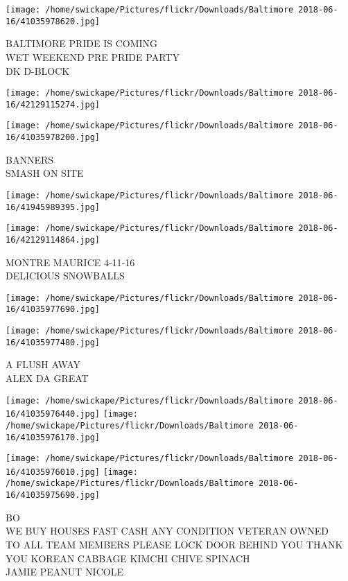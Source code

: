 \documentclass[10pt,letterpaper]{article}
\begin{document}
\vspace{0.25in}
\texttt{[image: /home/swickape/Pictures/flickr/Downloads/Baltimore 2018-06-16/41035978620.jpg]}

BALTIMORE PRIDE IS COMING\\
WET WEEKEND PRE PRIDE PARTY\\
DK D{-}BLOCK
\pagebreak

\texttt{[image: /home/swickape/Pictures/flickr/Downloads/Baltimore 2018-06-16/42129115274.jpg]}

\vspace{0.25in}
\texttt{[image: /home/swickape/Pictures/flickr/Downloads/Baltimore 2018-06-16/41035978200.jpg]}

BANNERS\\
SMASH ON SITE
\pagebreak

\texttt{[image: /home/swickape/Pictures/flickr/Downloads/Baltimore 2018-06-16/41945989395.jpg]}

\vspace{0.25in}
\texttt{[image: /home/swickape/Pictures/flickr/Downloads/Baltimore 2018-06-16/42129114864.jpg]}

MONTRE MAURICE 4{-}11{-}16\\
DELICIOUS SNOWBALLS
\pagebreak

\texttt{[image: /home/swickape/Pictures/flickr/Downloads/Baltimore 2018-06-16/41035977690.jpg]}

\vspace{0.25in}
\texttt{[image: /home/swickape/Pictures/flickr/Downloads/Baltimore 2018-06-16/41035977480.jpg]}

A FLUSH AWAY\\
ALEX DA GREAT
\pagebreak

\texttt{[image: /home/swickape/Pictures/flickr/Downloads/Baltimore 2018-06-16/41035976440.jpg]}
\texttt{[image: /home/swickape/Pictures/flickr/Downloads/Baltimore 2018-06-16/41035976170.jpg]}

\texttt{[image: /home/swickape/Pictures/flickr/Downloads/Baltimore 2018-06-16/41035976010.jpg]}
\texttt{[image: /home/swickape/Pictures/flickr/Downloads/Baltimore 2018-06-16/41035975690.jpg]}

BO\\
WE BUY HOUSES FAST CASH ANY CONDITION VETERAN OWNED\\
TO ALL TEAM MEMBERS PLEASE LOCK DOOR BEHIND YOU THANK YOU KOREAN CABBAGE KIMCHI CHIVE SPINACH\\
JAMIE PEANUT NICOLE
\pagebreak
\end{document}
